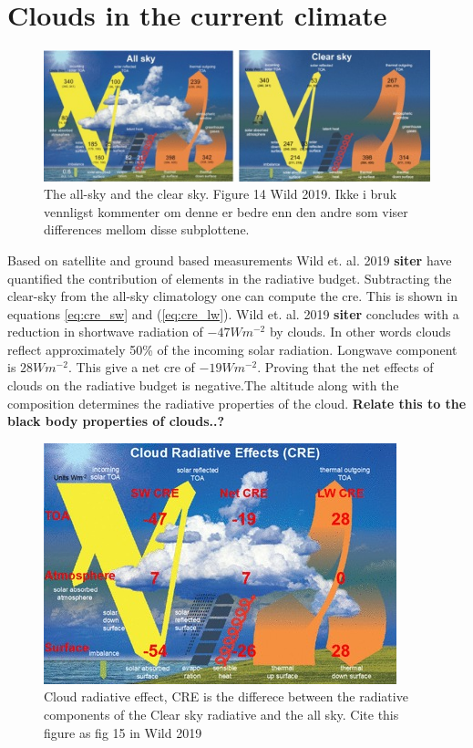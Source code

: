 \section{Clouds in the current climate} \label{sec:intro_cloud_current_climate}
\begin{figure}[h] %
    \centering
    \includegraphics[scale = 7]{Chapter1_Intro/images/both_wild2019.jpg}
    \caption{The all-sky and the clear sky. Figure 14 Wild 2019. Ikke i bruk vennligst kommenter om denne er bedre enn den andre som viser differences mellom disse subplottene.}
    \label{fig:both_wild}
\end{figure}

Based on satellite and ground based measurements Wild et. al. 2019 \textbf{siter} have quantified the contribution of elements in the radiative budget. Subtracting the clear-sky from the all-sky climatology one can compute the \acrfull{cre}. This is shown in equations \eqref{eq:cre_sw} and (\ref{eq:cre_lw}). Wild et. al. 2019 \textbf{siter} concludes with a reduction in shortwave radiation of $-47Wm^{-2}$ by clouds. In other words clouds reflect approximately 50\% of the incoming solar radiation. Longwave component is $28Wm^{-2}$. This give a net \acrshort{cre} of $-19Wm^{-2}$. Proving that the net effects of clouds on the radiative budget is negative.The altitude along with the composition determines the radiative properties of the cloud. \textbf{Relate this to the black body properties of clouds..?}
\begin{figure}[h]
    \centering
    \includegraphics[scale = 7]{Chapter1_Intro/images/CRE_wild2019.jpg}
    \caption{Cloud radiative effect, CRE is the differece between the radiative components of the Clear sky radiative and the all sky. Cite this figure as fig 15 in Wild 2019}
    \label{fig:cre}
\end{figure}

